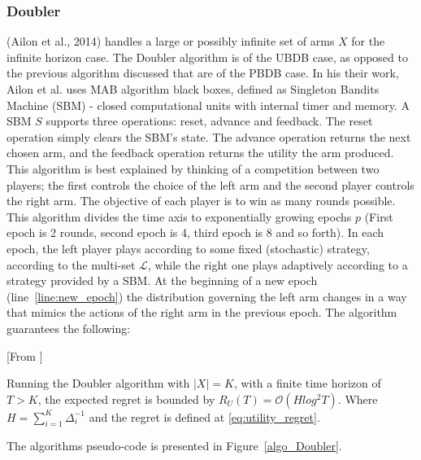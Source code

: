 \documentclass{llncs}
\begin{document}
	\subsubsection{Doubler}
	(Ailon et al., 2014) handles a large or possibly infinite set of arms $X$ for the infinite horizon case.
	The Doubler algorithm is of the UBDB case, as opposed to the previous algorithm discussed that are of the PBDB case.
	In his their work, Ailon et al. uses MAB algorithm black boxes, defined as Singleton Bandits Machine (SBM) - closed computational units with internal timer and memory.
	A SBM $S$ supports three operations: reset, advance and feedback. The reset operation simply clears the SBM's state.
	The advance operation returns the next chosen arm, and the feedback operation returns the utility the arm produced.
	This algorithm is best explained by thinking of a competition between two players; the first controls the choice of the left arm and the second player controls the right arm. 
	The objective of each player is to win as many rounds possible.
	This algorithm divides the time axis to exponentially growing epochs  $p$ (First epoch is 2 rounds, second epoch is 4, third epoch is 8 and so forth).
	In each epoch, the left player plays according to some fixed (stochastic) strategy, according to the multi-set $\mathcal{L}$, while the right one plays adaptively according to a strategy provided by a SBM. 
	At the beginning of a new epoch (line~\ref{line:new_epoch}) the distribution governing the left arm changes in a way that mimics the actions of the right arm in the previous epoch.
	The algorithm guarantees the following:
	\begin{theorem}\label{thm:Doubler}[From \cite{...}]

		Running the Doubler algorithm with $|X|=K$, with a finite time horizon of $T>K$, the expected regret is bounded by $R_U(T) = \mathcal{O} \left(H log^2 T \right)$. Where $H=\sum_{i=1}^K \Delta^{-1}_i$ and the regret is defined at \eqref{eq:utility_regret}.

	\end{theorem}
	The algorithms pseudo-code is presented in Figure~\ref{algo_Doubler}.
\end{document}
